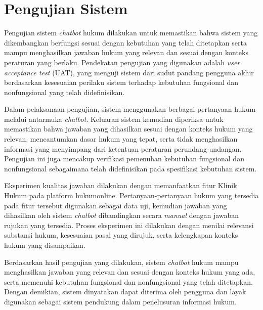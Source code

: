 \chapter{Pengujian Sistem}
\label{app:pengujian}

Pengujian sistem \emph{chatbot} hukum dilakukan untuk memastikan bahwa sistem yang dikembangkan berfungsi sesuai dengan kebutuhan yang telah ditetapkan serta mampu menghasilkan jawaban hukum yang relevan dan sesuai dengan konteks peraturan yang berlaku. Pendekatan pengujian yang digunakan adalah \emph{user acceptance test} (UAT), yang menguji sistem dari sudut pandang pengguna akhir berdasarkan kesesuaian perilaku sistem terhadap kebutuhan fungsional dan nonfungsional yang telah didefinisikan.

Dalam pelaksanaan pengujian, sistem menggunakan berbagai pertanyaan hukum melalui antarmuka \emph{chatbot}. Keluaran sistem kemudian diperiksa untuk memastikan bahwa jawaban yang dihasilkan sesuai dengan konteks hukum yang relevan, mencantumkan dasar hukum yang tepat, serta tidak menghasilkan informasi yang menyimpang dari ketentuan peraturan perundang-undangan. Pengujian ini juga mencakup verifikasi pemenuhan kebutuhan fungsional dan nonfungsional sebagaimana telah didefinisikan pada spesifikasi kebutuhan sistem.

Eksperimen kualitas jawaban dilakukan dengan memanfaatkan fitur Klinik Hukum pada platform hukumonline. Pertanyaan-pertanyaan hukum yang tersedia pada fitur tersebut digunakan sebagai data uji, kemudian jawaban yang dihasilkan oleh sistem \emph{chatbot} dibandingkan secara \emph{manual} dengan jawaban rujukan yang tersedia. Proses eksperimen ini dilakukan dengan menilai relevansi substansi hukum, kesesuaian pasal yang dirujuk, serta kelengkapan konteks hukum yang disampaikan.

Berdasarkan hasil pengujian yang dilakukan, sistem \emph{chatbot} hukum mampu menghasilkan jawaban yang relevan dan sesuai dengan konteks hukum yang ada, serta memenuhi kebutuhan fungsional dan nonfungsional yang telah ditetapkan. Dengan demikian, sistem dinyatakan dapat diterima oleh pengguna dan layak digunakan sebagai sistem pendukung dalam penelusuran informasi hukum.
